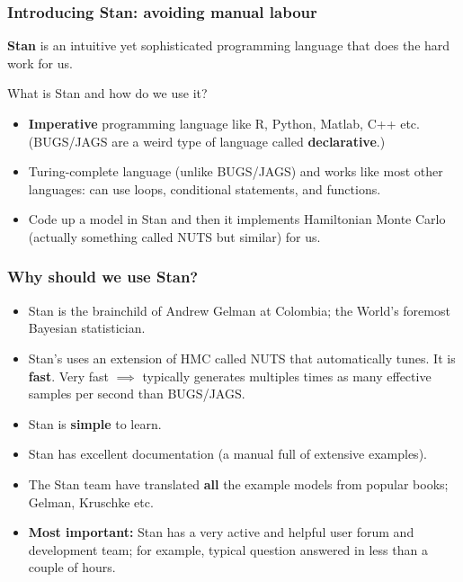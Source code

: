 \documentclass[handout]{beamer}
\begin{document}
\begin{frame}
\frametitle{Introducing Stan: avoiding manual labour}
\textbf{Stan} is an intuitive yet sophisticated programming language that does the hard work for us.

 What is Stan and how do we use it?

\begin{itemize}
\item<4-> \textbf{Imperative} programming language like R, Python, Matlab, C++ etc. (BUGS/JAGS are a weird type of language called \textbf{declarative}.)
\item<5-> Turing-complete language (unlike BUGS/JAGS) and works like most other languages: can use loops, conditional statements, and functions.
\item<6-> Code up a model in Stan and then it implements Hamiltonian Monte Carlo (actually something called NUTS but similar) for us.
\end{itemize}

\end{frame}

\begin{frame}
\frametitle{Why should we use Stan?}

\begin{itemize}
\item<2-> Stan is the brainchild of Andrew Gelman at Colombia; the World's foremost Bayesian statistician.
\item<3-> Stan's uses an extension of HMC called NUTS that automatically tunes. It is \textbf{fast}. Very fast $\implies$ typically generates multiples times as many effective samples per second than BUGS/JAGS. 
\item<4-> Stan is \textbf{simple} to learn.
\item<5-> Stan has excellent documentation (a manual full of extensive examples).
\item<6-> The Stan team have translated \textbf{all} the example models from popular books; Gelman, Kruschke etc.
\item<7-> \textbf{Most important:} Stan has a very active and helpful user forum and development team; for example, typical question answered in less than a couple of hours.
\end{itemize}

\end{frame}
\end{document}
